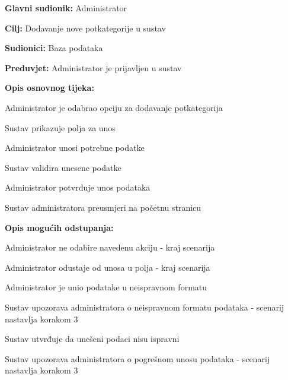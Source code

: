 					\noindent {}
					\begin{packed_item}
	
						\item \textbf{Glavni sudionik: }Administrator
						\item  \textbf{Cilj:} Dodavanje nove potkategorije u sustav
						\item  \textbf{Sudionici:} Baza podataka
						\item  \textbf{Preduvjet:} Administrator je prijavljen u sustav
						\item  \textbf{Opis osnovnog tijeka:}
						
						\item[] \begin{packed_enum}
							\item Administrator je odabrao opciju za dodavanje potkategorija
							\item Sustav prikazuje polja za unos
							\item Administrator unosi potrebne podatke
							\item Sustav validira unesene podatke
							\item Administrator potvrđuje unos podataka
							\item Sustav administratora preusmjeri na početnu stranicu
						\end{packed_enum}
						
						\eject
						
						\item  \textbf{Opis mogućih odstupanja:}

						\item[] \begin{packed_item}
							\item[1.a] Administrator ne odabire navedenu akciju - kraj scenarija
							\item[3.a] Administrator odustaje od unosa u polja - kraj scenarija
							\item[4.a] Administrator je unio podatake u neispravnom formatu
							\item[] \begin{packed_enum}
								\item Sustav upozorava administratora o neispravnom formatu podataka - scenarij nastavlja korakom 3
							\end{packed_enum}	
							\item[6.a] Sustav utvrđuje da unešeni podaci nisu ispravni
							\item[] \begin{packed_enum}
								\item Sustav upozorava administratora o pogrešnom unosu podataka - scenarij nastavlja korakom 3
							\end{packed_enum}					
						\end{packed_item}
					\end{packed_item}

